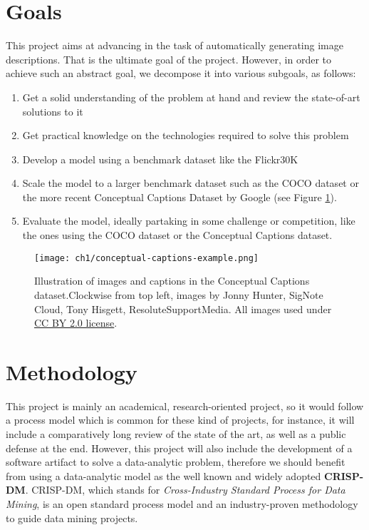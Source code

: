 \section{Goals}

This project aims at advancing in the task of automatically generating image descriptions. That is the ultimate goal of the project. However, in order to achieve such an abstract goal, we decompose it into various subgoals, as follows:

\begin{enumerate}
\item Get a solid understanding of the problem at hand and review the state-of-art solutions to it
\item Get practical knowledge on the technologies required to solve this problem
\item Develop a model using a benchmark dataset like the Flickr30K
\item Scale the model to a larger benchmark dataset such as the COCO\cite{Lin2014} dataset or the more recent Conceptual Captions Dataset by Google \cite{Sharma2018}  (see Figure \ref{fig:conceptual-captions}).
\item Evaluate the model, ideally partaking in some challenge or competition, like the ones using the COCO dataset or the Conceptual Captions dataset.
\end{enumerate}

\begin{figure}[hpt]
	\centering
	\texttt{[image: ch1/conceptual-captions-example.png]}
	\caption{Illustration of images and captions in the Conceptual Captions dataset.Clockwise from top left, images by Jonny Hunter, SigNote Cloud, Tony Hisgett, ResoluteSupportMedia. All images used under \href{https://creativecommons.org/licenses/by/2.0/}{CC BY 2.0 license}.}
	\label{fig:conceptual-captions}
\end{figure}

\section{Methodology}

This project is mainly an academical, research-oriented project, so it would follow a process model which is common for these kind of projects, for instance, it will include a comparatively long review of the state of the art, as well as a public defense at the end. However, this project will also include the development of a software artifact to solve a data-analytic problem, therefore we should benefit from using a data-analytic model as the well known and widely adopted \textbf{CRISP-DM}. CRISP-DM, which stands for \textit{Cross-Industry Standard Process for Data Mining}, is an open standard process model and an industry-proven methodology to guide data mining projects.

